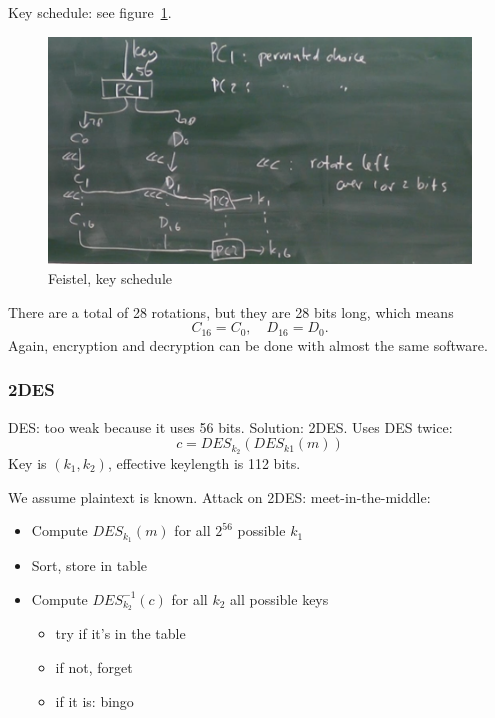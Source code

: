 \documentclass[language=english,number=]{homework}
\begin{document}
    Key schedule: see figure~\ref{feistelkey}.
\begin{figure}
    \centering
    \includegraphics[width=\textwidth]{feistelkey.PNG}
    \caption{Feistel, key schedule}
    \label{feistelkey}
\end{figure}

    There are a total of 28 rotations, but they are 28 bits long, which means
    \[
        C_{16} = C_0, \quad D_{16} = D_0.
    \]
    Again, encryption and decryption can be done with almost the same software.

    \subsubsection{2DES}

    DES: too weak because it uses 56 bits.
    Solution: 2DES.
    Uses DES twice:
    \[
        c = DES_{k_2}(DES_{k1}(m))
    \]
    Key is $(k_1, k_2)$, effective keylength is 112 bits.

    We assume plaintext is known.
    Attack on 2DES: meet-in-the-middle:
    \begin{itemize}
        \item Compute $DES_{k_1}(m)$ for all $2^{56}$ possible $k_1$
        \item Sort, store in table
        \item Compute $DES_{k_2}^{-1}(c)$ for all $k_2$ all possible keys
        \begin{itemize}
            \item try if it's in the table
            \item if not, forget
            \item if it is: bingo
        \end{itemize}
    \end{itemize}
\end{document}
